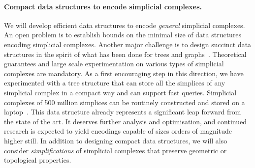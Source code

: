 \paragraph{Compact data structures to encode simplicial complexes.}  We will develop efficient data structures to encode {\em general} simplicial complexes. 
An open problem is to establish bounds on the minimal size of data structures encoding simplicial complexes. Another major challenge is to design succinct data structures
in the spirit of what has been done for trees and graphs~\cite{Ferragina:2005:SLT:1097112.1097456,Munro:2002:SRB:586840.586885}. 
 Theoretical guarantees and large scale experimentation on various
 types of simplicial complexes are mandatory. As a first encouraging
 step in this direction, we have experimented with a tree structure
 that can store all the simplices of any simplicial complex in a
 compact way and can support fast queries. Simplicial complexes of 500 million simplices can be routinely constructed and stored on a laptop~\cite{bm-dssc-2012}.  
This data structure already represents a significant leap forward from the state of the art. It deserves further analysis and optimisation, and continued research is expected to yield encodings capable of sizes orders of magnitude higher still.
In addition to designing compact data structures, we will also consider {\em simplifications} of simplicial complexes that preserve geometric or topological properties.










